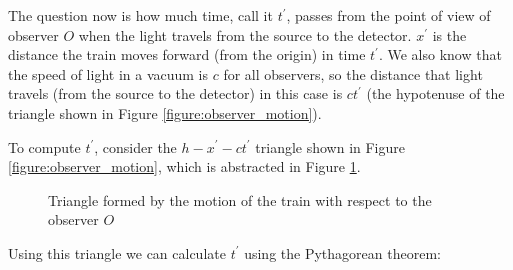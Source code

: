 \documentclass{article}
\theoremstyle{definition}
\begin{document}
\bigskip
\noindent
The question now is how much time, call it $t^{\prime}$, passes
from the point of view of observer $O$ when the light travels
from the source to the detector. $x^{\prime}$ is the distance the
train moves forward (from the origin) in time $t^{\prime}$. We
also know that the speed of light in a vacuum is $c$ for all
observers, so the distance that light travels (from the source to
the detector) in this case is $c t^{\prime}$ (the hypotenuse of
the triangle shown in Figure \ref{figure:observer_motion}).

\medskip
\noindent
{} 

\bigskip
\noindent
To compute $t^{\prime}$, consider the $h-x^{\prime}-c t^{\prime}$ 
triangle shown in Figure \ref{figure:observer_motion}, which is abstracted 
in Figure \ref{figure:triangle}. 

\begin{figure}[H]
  \centering
  \resizebox{0.35 \textwidth}{!} {                                                                      %
     }
  \caption{Triangle formed by the motion of the train with respect to the observer $O$}
  \label{figure:triangle}
\end{figure}

\bigskip
\noindent
Using this triangle we can calculate $t^{\prime}$ using the
Pythagorean theorem:
\end{document}

